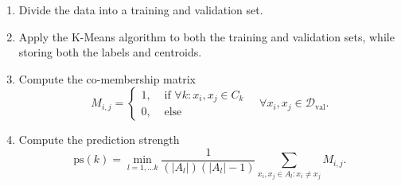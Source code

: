 \begin{enumerate}

	\item Divide the data into a training and validation set.

	\item Apply the K-Means algorithm to both the training and validation sets, while storing both the labels and centroids.

	\item Compute the co-membership matrix
	      \[
		      M_{i,j} =
		      \begin{cases}
			      1, & \text{ if } \forall k : x_i, x_j \in C_k \\
			      0, & \text{ else}
		      \end{cases}
		      \quad
		      \forall x_i, x_j \in \mathcal{D}_{\text{val}}.
	      \]

	\item Compute the prediction strength
	      \[
		      \mathrm{ps}(k) = \min_{l = 1, \dots k} \frac{1}{(|A_l|)(|A_l| - 1)} \sum_{x_i, x_j \in A_l: x_i \ne x_j} M_{i,j}.
	      \]
\end{enumerate}


